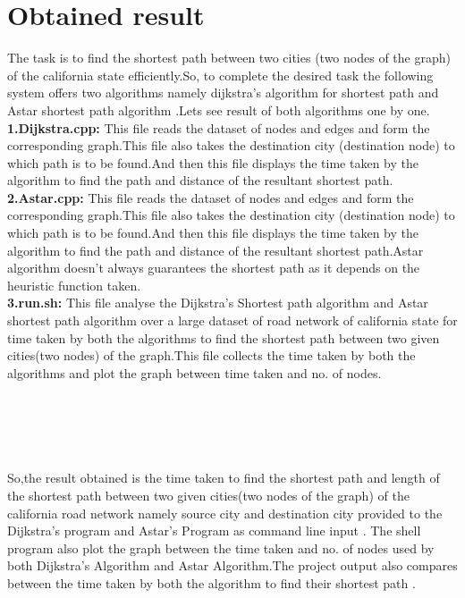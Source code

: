 \documentclass[14pt,a4]{extreport}
\begin{document}
\section{Obtained result}
The task is to find the shortest path between two cities (two nodes of the graph) of the california state efficiently.So, to complete the desired task the following system offers two algorithms namely dijkstra's algorithm for shortest path and Astar shortest path algorithm .Lets see result of both algorithms one by one.\newline
\\
\textbf{1.Dijkstra.cpp:}\newline
This file reads the dataset of nodes and edges and form the corresponding graph.This file also takes the destination city (destination node) to which path is to be found.And then this file displays the time taken by the algorithm to find the path and distance of the resultant shortest path.
\newline
\\
\textbf{2.Astar.cpp:}\newline
This file reads the dataset of nodes and edges and form the corresponding graph.This file also takes the destination city (destination node) to which path is to be found.And then this file displays the time taken by the algorithm to find the path and distance of the resultant shortest path.Astar algorithm doesn't always guarantees the shortest path as it depends on the heuristic function taken.
\newline
\\
\textbf{3.run.sh:}\newline
This file analyse the Dijkstra's Shortest path algorithm and Astar shortest path algorithm over a large dataset of road network of california state for time taken by both the algorithms to find the shortest path between two given cities(two nodes) of the graph.This file collects the time taken by both the algorithms and plot the graph between time taken and no. of nodes.
\\\\\\\\\\\\
So,the result obtained is the time taken to find the shortest path and length of the shortest path between two given cities(two nodes of the graph) of the california road network namely source city and destination city provided to the Dijkstra's program and Astar's Program as command line input .
The shell program also plot the graph between the time taken and no. of nodes used by both Dijkstra's Algorithm and Astar Algorithm.The project output also compares between the time taken by both the algorithm to find their shortest path .
\end{document}
